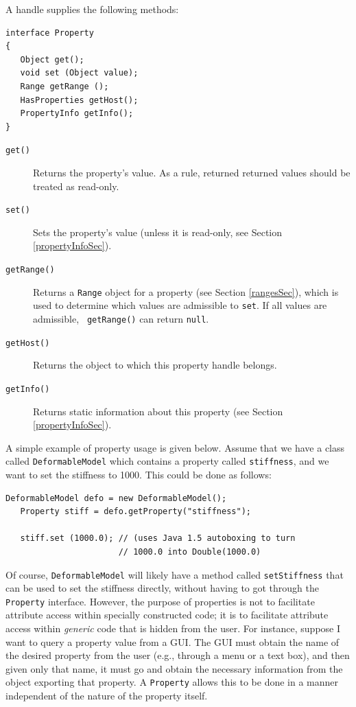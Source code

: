 A  handle supplies the following methods:
\begin{lstlisting}[]
interface Property
{
   Object get(); 
   void set (Object value); 
   Range getRange ();
   HasProperties getHost();
   PropertyInfo getInfo();
}
\end{lstlisting}

\begin{description}

\item[{\tt get()} ] \mbox{}

Returns the property's value. As a rule, returned 
returned values should be treated as read-only.

\item[{\tt set()} ] \mbox{}

Sets the property's value (unless it is read-only, see Section
\ref{propertyInfoSec}).

\item[{\tt getRange()} ] \mbox{}

Returns a {\tt Range} object for a property
(see Section \ref{rangesSec}), which is used to determine which values
are admissible to {\tt set}.  If all values are admissible, {\tt
getRange()} can return {\tt null}.

\item[{\tt getHost()} ] \mbox{}

Returns the object to which this property handle belongs.

\item[{\tt getInfo()} ] \mbox{}

Returns static information about this property (see Section
\ref{propertyInfoSec}).

\end{description}

A simple example of property usage is given below. Assume that we have
a class called {\tt DeformableModel} which contains a property called
{\tt stiffness}, and we want to set the stiffness to 1000. This
could be done as follows:
\begin{lstlisting}[]
   DeformableModel defo = new DeformableModel();    
   Property stiff = defo.getProperty("stiffness");

   stiff.set (1000.0); // (uses Java 1.5 autoboxing to turn
                       // 1000.0 into Double(1000.0)
\end{lstlisting}
Of course, {\tt DeformableModel} will likely have a method called
{\tt setStiffness} that can be used to set the stiffness directly, without
having to got through the {\tt Property} interface.  However, the
purpose of properties is not to facilitate attribute access within
specially constructed code; it is to facilitate attribute access
within {\it generic} code that is hidden from the user. For instance,
suppose I want to query a property value from a GUI. The GUI must
obtain the name of the desired property from the user (e.g., through a
menu or a text box), and then given only that name, it must go and
obtain the necessary information from the object exporting that
property.  A {\tt Property} allows this to be done in a manner
independent of the nature of the property itself.

